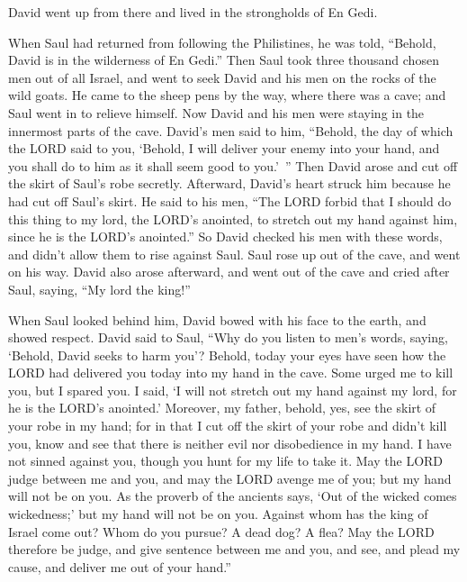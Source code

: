 \myverse{}David went up from there and lived in the strongholds of En
Gedi.


\mychapter{} \myverse*{}When Saul had returned from following the Philistines, he was
told, “Behold, David is in the wilderness of En Gedi.”
\myverse{}Then Saul took three thousand chosen men out of all Israel, and went to seek
David and his men on the rocks of the wild goats.
\myverse{}He came to the sheep pens by the way, where there was a cave; and Saul went
in to relieve himself. Now David and his men were staying in the innermost parts of the cave.
\myverse{}David’s men said to him, “Behold, the day of which the LORD said to you, ‘Behold,
I will deliver your enemy into your hand, and you shall do to him as it shall seem good to you.’ ” Then
David arose and cut off the skirt of Saul’s robe secretly.
\myverse{}Afterward, David’s heart struck him because he had cut off Saul’s skirt.
\myverse{}He said to his men, “The LORD forbid that I should do this thing to my lord,
the LORD’s anointed, to stretch out my hand against him, since he is the LORD’s anointed.”
\myverse{}So David checked his men with these words, and didn’t allow them to rise against
Saul. Saul rose up out of the cave, and went on his way.
\myverse{}David also arose afterward, and went out of the cave and cried after Saul,
saying, “My lord the king!”

When Saul looked behind him, David bowed with his face to the earth, and showed respect.
\myverse{}David said to Saul, “Why do you listen to men’s words, saying, ‘Behold, David
seeks to harm you’?
\myverse{}Behold, today your eyes have seen how the LORD had delivered you today into
my hand in the cave. Some urged me to kill you, but I spared you. I said, ‘I will not stretch out my hand
against my lord, for he is the LORD’s anointed.’
\myverse{}Moreover, my father, behold, yes, see the skirt of your robe in my hand;
for in that I cut off the skirt of your robe and didn’t kill you, know and see that there is neither evil
nor disobedience in my hand. I have not sinned against you, though you hunt for my life to take it.
\myverse{}May the LORD judge between me and you, and may the LORD avenge me of you;
but my hand will not be on you.
\myverse{}As the proverb of the ancients says, ‘Out of the wicked comes wickedness;’
but my hand will not be on you.
\myverse{}Against whom has the king of Israel come out? Whom do you pursue? A dead
dog? A flea?
\myverse{}May the LORD therefore be judge, and give sentence between me and you, and
see, and plead my cause, and deliver me out of your hand.”

